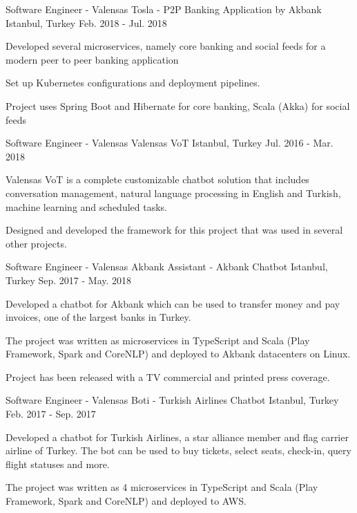 \begin{cventries}
  \cventry
    {Software Engineer - Valensas}
    {Tosla - P2P Banking Application by Akbank}
    {Istanbul, Turkey}
    {Feb. 2018 - Jul. 2018}
    {
      \begin{cvitems}
        \item {Developed several microservices, namely core banking and social feeds for a modern peer to peer banking application}
        \item {Set up Kubernetes configurations and deployment pipelines.}
        \item {Project uses Spring Boot and Hibernate for core banking, Scala (Akka) for social feeds}
      \end{cvitems}
    } 

  \cventry
    {Software Engineer - Valensas}
    {Valensas VoT}
    {Istanbul, Turkey}
    {Jul. 2016 - Mar. 2018}
    {
      \begin{cvitems}
        \item {Valensas VoT is a complete customizable chatbot solution that includes conversation management, natural language processing in English and Turkish, machine learning and scheduled tasks.}
        \item {Designed and developed the framework for this project that was used in several other projects.}
      \end{cvitems}
    }   
    
  \cventry
    {Software Engineer - Valensas}
    {Akbank Assistant - Akbank Chatbot}
    {Istanbul, Turkey}
    {Sep. 2017 - May. 2018}
    {
      \begin{cvitems}
        \item {Developed a chatbot for Akbank which can be used to transfer money and pay invoices, one of the largest banks in Turkey.}
        \item {The project was written as microservices in TypeScript and Scala (Play Framework, Spark and CoreNLP) and deployed to Akbank datacenters on Linux.}
        \item {Project has been released with a TV commercial and printed press coverage.}
      \end{cvitems}
    }

  \cventry
    {Software Engineer - Valensas}
    {Boti - Turkish Airlines Chatbot}
    {Istanbul, Turkey}
    {Feb. 2017 - Sep. 2017}
    {
      \begin{cvitems}
        \item {Developed a chatbot for Turkish Airlines, a star alliance member and flag carrier airline of Turkey. The bot can be used to buy tickets, select seats, check-in, query flight statuses and more.}
        \item {The project was written as 4 microservices in TypeScript and Scala (Play Framework, Spark and CoreNLP) and deployed to AWS.}
      \end{cvitems}
    }


\end{cventries}
